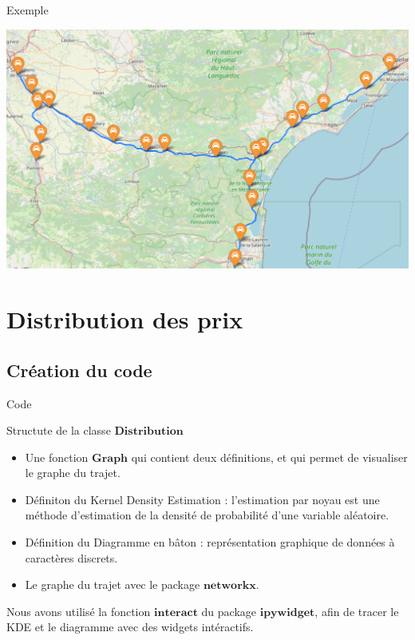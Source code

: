 \documentclass{beamer}
\begin{document}
\begin{frame}[fragile]{Exemple}
\begin{center}
\includegraphics[scale=0.3]{carte.png}
\end{center}
\end{frame}

\section{Distribution des prix}
\subsection{Création du code}

\begin{frame}[fragile]{Code}
\begin{block}{Structute de la classe $\textbf{Distribution}$ }
\end{block}
\begin{itemize}
\item Une fonction $\textbf{Graph}$ qui contient deux définitions, et qui permet de visualiser le graphe du trajet. 
\pause
\item Définiton du Kernel Density Estimation : l’estimation par noyau est une méthode d’estimation de la densité de probabilité d’une variable aléatoire. 
\pause
\item Définition du Diagramme en bâton : représentation graphique de données à caractères discrets.
\pause
\item Le graphe du trajet avec le package $\textbf{networkx}$.
\end{itemize}
\pause
Nous avons utilisé la fonction $\textbf{interact}$ du package $\textbf{ipywidget}$, afin de tracer le KDE et le diagramme avec des widgets intéractifs.
\end{frame}
\end{document}
